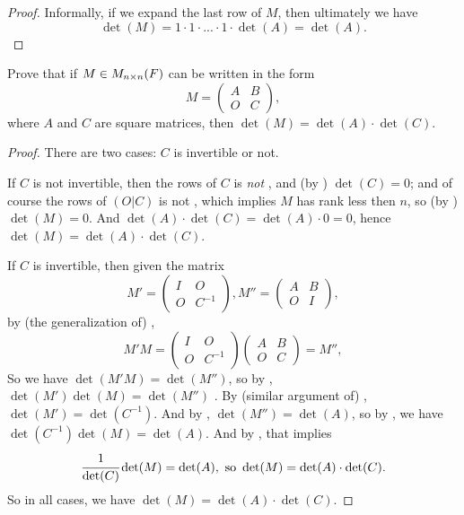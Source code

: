 \begin{proof}
Informally, if we expand the last row of \(M\), then ultimately we have
\[
    \det(M) = 1 \cdot 1 \cdot ... \cdot 1 \cdot \det(A) = \det(A).
\]
\end{proof}

\begin{exercise} \label{exercise 4.3.21}
Prove that if \(M \in M_{n \times n}(F)\) can be written in the form
\[
    M = \begin{pmatrix} A & B \\ O & C \end{pmatrix},
\]
where \(A\) and \(C\) are square matrices, then \(\det(M) = \det(A) \cdot \det(C)\).
\end{exercise}

\begin{proof}
There are two cases: \(C\) is invertible or not.

If \(C\) is not invertible, then the rows of \(C\) is \emph{not} \LID{}, and (by ) \(\det(C) = 0\);
and of course the rows of \((O|C)\) is not \LID{}, which implies \(M\) has rank less then \(n\), so (by ) \(\det(M) = 0\).
And \(\det(A) \cdot \det(C) = \det(A) \cdot 0 = 0\), hence \(\det(M) = \det(A) \cdot \det(C)\).

If \(C\) is invertible, then given the matrix
\[
    M' = \begin{pmatrix} I & O \\ O & C^{-1} \end{pmatrix},
    M'' = \begin{pmatrix} A & B \\ O & I \end{pmatrix},
\]
by (the generalization of) ,
\[
    M' M =
    \begin{pmatrix} I & O \\ O & C^{-1} \end{pmatrix}
    \begin{pmatrix} A & B \\ O & C \end{pmatrix}
    = M'',
\]
So we have \(\det(M' M) = \det(M'')\), so by , \(\det(M')\det(M) = \det(M'')\) .
By (similar argument of) , \(\det(M') = \det(C^{-1})\).
And by , \(\det(M'') = \det(A)\), so by , we have \(\det(C^{-1}) \det(M) = \det(A)\).
And by , that implies
\[
    \cfrac{1}{\det(C)} \det(M) = \det(A), \text{ so } \det(M) = \det(A) \cdot \det(C).
\]
So in all cases, we have \(\det(M) = \det(A) \cdot \det(C)\).
\end{proof}

